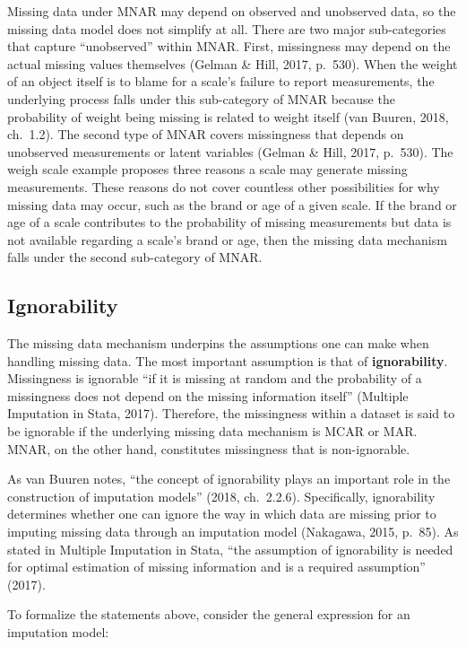 \documentclass[12pt,oneside]{chicagocapstone}
\begin{document}
Missing data under MNAR may depend on observed and unobserved data, so
the missing data model does not simplify at all. There are two major
sub-categories that capture ``unobserved'' within MNAR. First,
missingness may depend on the actual missing values themselves (Gelman
\& Hill, 2017, p.~530). When the weight of an object itself is to blame
for a scale's failure to report measurements, the underlying process
falls under this sub-category of MNAR because the probability of weight
being missing is related to weight itself (van Buuren, 2018, ch.~1.2).
The second type of MNAR covers missingness that depends on unobserved
measurements or latent variables (Gelman \& Hill, 2017, p.~530). The
weigh scale example proposes three reasons a scale may generate missing
measurements. These reasons do not cover countless other possibilities
for why missing data may occur, such as the brand or age of a given
scale. If the brand or age of a scale contributes to the probability of
missing measurements but data is not available regarding a scale's brand
or age, then the missing data mechanism falls under the second
sub-category of MNAR.

\subsection*{Ignorability}\label{background-ignorability}

The missing data mechanism underpins the assumptions one can make when
handling missing data. The most important assumption is that of
\textbf{ignorability}. Missingness is ignorable ``if it is missing at
random and the probability of a missingness does not depend on the
missing information itself'' (Multiple Imputation in Stata, 2017).
Therefore, the missingness within a dataset is said to be ignorable if
the underlying missing data mechanism is MCAR or MAR. MNAR, on the other
hand, constitutes missingness that is non-ignorable.

As van Buuren notes, ``the concept of ignorability plays an important
role in the construction of imputation models'' (2018, ch.~2.2.6).
Specifically, ignorability determines whether one can ignore the way in
which data are missing prior to imputing missing data through an
imputation model (Nakagawa, 2015, p.~85). As stated in Multiple
Imputation in Stata, ``the assumption of ignorability is needed for
optimal estimation of missing information and is a required assumption''
(2017).

To formalize the statements above, consider the general expression for
an imputation model:
\end{document}
